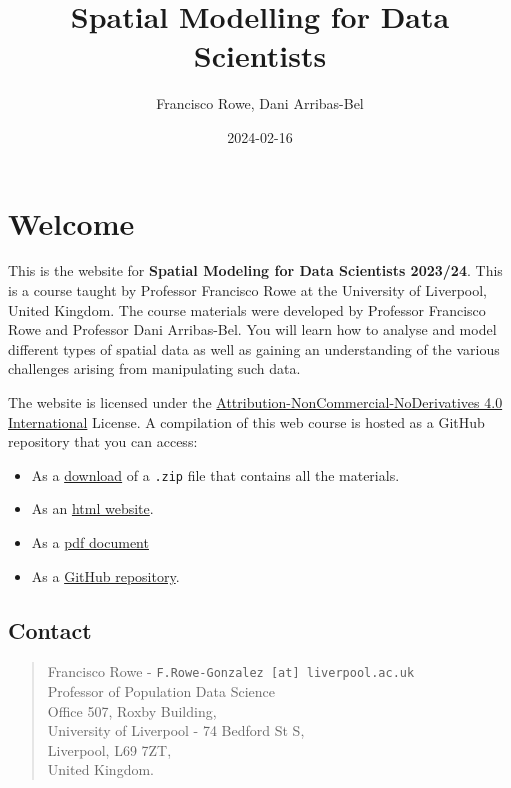 \documentclass[
  letterpaper,
  DIV=11,
  numbers=noendperiod,
  oneside]{scrreprt}
\title{Spatial Modelling for Data Scientists}
\author{Francisco Rowe, Dani Arribas-Bel}
\date{2024-02-16}
\providecommand{\tightlist}{%
  \setlength{\itemsep}{0pt}\setlength{\parskip}{0pt}}\usepackage{longtable,booktabs,array}
\renewcommand*\contentsname{Table of contents}
\newcommand\contentsname{Table of contents}
\begin{document}
\maketitle

\renewcommand*\contentsname{Table of contents}
{
\hypersetup{linkcolor=}
\setcounter{tocdepth}{2}
\tableofcontents
}

\chapter*{Welcome}\label{welcome}


This is the website for \textbf{Spatial Modeling for Data Scientists
2023/24}. This is a course taught by Professor Francisco Rowe at the
University of Liverpool, United Kingdom. The course materials were
developed by Professor Francisco Rowe and Professor Dani Arribas-Bel.
You will learn how to analyse and model different types of spatial data
as well as gaining an understanding of the various challenges arising
from manipulating such data.

The website is licensed under the
\href{https://creativecommons.org/licenses/by-nc-nd/4.0/}{Attribution-NonCommercial-NoDerivatives
4.0 International} License. A compilation of this web course is hosted
as a GitHub repository that you can access:

\begin{itemize}
\tightlist
\item
  As a
  \href{https://github.com/GDSL-UL/san/archive/master.zip}{download} of
  a \texttt{.zip} file that contains all the materials.
\item
  As an \href{https://gdsl-ul.github.io/san/}{html website}.
\item
  As a
  \href{https://gdsl-ul.github.io/san/spatial_analysis_notes.pdf}{pdf
  document}
\item
  As a \href{https://github.com/GDSL-UL/san}{GitHub repository}.
\end{itemize}

\section*{Contact}\label{contact}


\begin{quote}
Francisco Rowe - \texttt{F.Rowe-Gonzalez\ {[}at{]}\ liverpool.ac.uk}\\
Professor of Population Data Science\\
Office 507, Roxby Building,\\
University of Liverpool - 74 Bedford St S,\\
Liverpool, L69 7ZT,\\
United Kingdom.
\end{quote}
\end{document}
